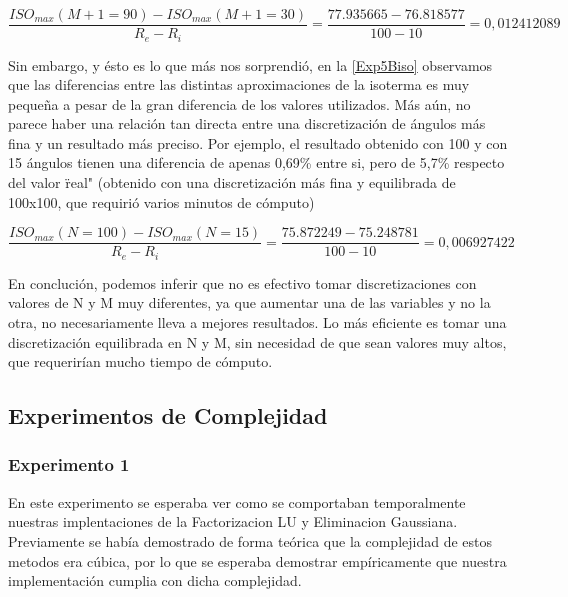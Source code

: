 \documentclass[12pt,a4paper]{article}
\begin{document}
\begin{equation}
\frac{ISO_{max}(M+1=90) - ISO_{max}(M+1=30)}{R_e - R_i} = \frac{77.935665
 - 76.818577}{100 - 10} = 0,012412089
\end{equation}

Sin embargo, y ésto es lo que más nos sorprendió, en la \ref{Exp5Biso} observamos que las diferencias entre las distintas aproximaciones de la isoterma es muy pequeña a pesar de la gran diferencia de los valores utilizados. Más aún, no parece haber una relación tan directa entre una discretización de ángulos más fina y un resultado más preciso. Por ejemplo, el resultado obtenido con 100 y con 15 ángulos tienen una diferencia de apenas 0,69\% entre si, pero de 5,7\% respecto del valor \"real" (obtenido con una discretización más fina y equilibrada de 100x100, que requirió varios minutos de cómputo)

\begin{equation}
\frac{ISO_{max}(N=100) - ISO_{max}(N=15)}{R_e - R_i} = \frac{75.872249 - 75.248781}{100 - 10} = 0,006927422
\end{equation}

En conclución, podemos inferir que no es efectivo tomar discretizaciones con valores de N y M muy diferentes, ya que aumentar una de las variables y no la otra, no necesariamente lleva a mejores resultados. Lo más eficiente es tomar una discretización equilibrada en N y M, sin necesidad de que sean valores muy altos, que requerirían mucho tiempo de cómputo. 

\subsection{Experimentos de Complejidad}

\subsubsection{Experimento 1}

En este experimento se esperaba ver como se comportaban temporalmente nuestras implentaciones de la Factorizacion LU y Eliminacion Gaussiana. Previamente se había demostrado de forma teórica que la complejidad de estos metodos era cúbica, por lo que se esperaba demostrar empíricamente que nuestra implementación cumplia con dicha complejidad.
\end{document}

